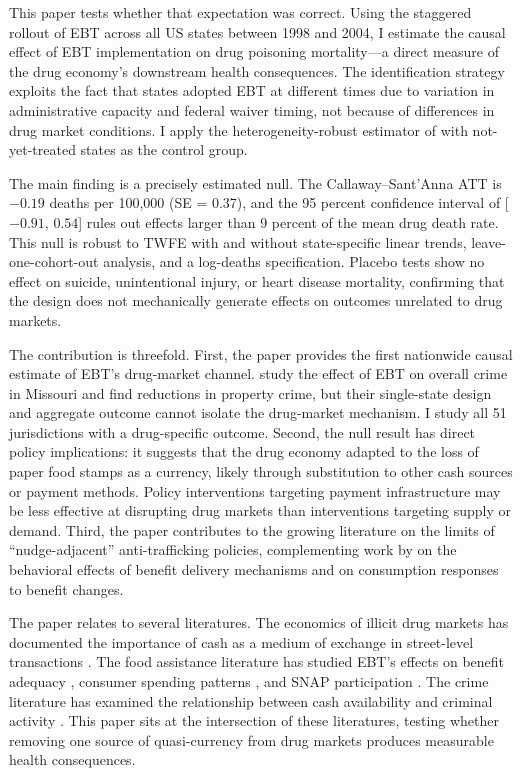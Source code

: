 \documentclass[12pt]{article}
\begin{document}
This paper tests whether that expectation was correct. Using the staggered rollout of EBT across all US states between 1998 and 2004, I estimate the causal effect of EBT implementation on drug poisoning mortality---a direct measure of the drug economy's downstream health consequences. The identification strategy exploits the fact that states adopted EBT at different times due to variation in administrative capacity and federal waiver timing, not because of differences in drug market conditions. I apply the heterogeneity-robust estimator of \citet{callaway2021difference} with not-yet-treated states as the control group.

The main finding is a precisely estimated null. The Callaway--Sant'Anna ATT is $-0.19$ deaths per 100,000 (SE = 0.37), and the 95 percent confidence interval of [$-0.91$, $0.54$] rules out effects larger than 9 percent of the mean drug death rate. This null is robust to TWFE with and without state-specific linear trends, leave-one-cohort-out analysis, and a log-deaths specification. Placebo tests show no effect on suicide, unintentional injury, or heart disease mortality, confirming that the design does not mechanically generate effects on outcomes unrelated to drug markets.

The contribution is threefold. First, the paper provides the first nationwide causal estimate of EBT's drug-market channel. \citet{wright2017electronic} study the effect of EBT on overall crime in Missouri and find reductions in property crime, but their single-state design and aggregate outcome cannot isolate the drug-market mechanism. I study all 51 jurisdictions with a drug-specific outcome. Second, the null result has direct policy implications: it suggests that the drug economy adapted to the loss of paper food stamps as a currency, likely through substitution to other cash sources or payment methods. Policy interventions targeting payment infrastructure may be less effective at disrupting drug markets than interventions targeting supply or demand. Third, the paper contributes to the growing literature on the limits of ``nudge-adjacent'' anti-trafficking policies, complementing work by \citet{hastings2010first} on the behavioral effects of benefit delivery mechanisms and \citet{ganong2019consumer} on consumption responses to benefit changes.

The paper relates to several literatures. The economics of illicit drug markets has documented the importance of cash as a medium of exchange in street-level transactions \citep{reuter2006assessment, caulkins2010drug}. The food assistance literature has studied EBT's effects on benefit adequacy \citep{whitmore2002food}, consumer spending patterns \citep{hastings2010first}, and SNAP participation \citep{currie2008transfers}. The crime literature has examined the relationship between cash availability and criminal activity \citep{wright2017electronic, foley2011sex}. This paper sits at the intersection of these literatures, testing whether removing one source of quasi-currency from drug markets produces measurable health consequences.
\end{document}
